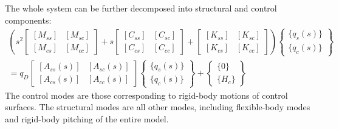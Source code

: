 The whole system can be further decomposed into structural and control components:
\begin{multline}
    \left( s^2 \begin{bmatrix}
        [M_{ss}] & [M_{sc}] \\
        [M_{cs}] & [M_{cc}]
    \end{bmatrix} + s \begin{bmatrix}
        [C_{ss}] & [C_{sc}] \\
        [C_{cs}] & [C_{cc}]
    \end{bmatrix} + \begin{bmatrix}
        [K_{ss}] & [K_{sc}] \\
        [K_{cs}] & [K_{cc}]
    \end{bmatrix} \right) \begin{Bmatrix}
        \{q_s(s)\} \\
        \{q_c(s)\}
    \end{Bmatrix} \\ = q_D \begin{bmatrix}
        [A_{ss}(s)] & [A_{sc}(s)] \\
        [A_{cs}(s)] & [A_{cc}(s)]
    \end{bmatrix} \begin{Bmatrix}
        \{q_s(s)\} \\
        \{q_c(s)\}
    \end{Bmatrix}
    + \begin{Bmatrix}
        \{0\} \\
        \{H_c\}
    \end{Bmatrix}
\end{multline}
The control modes are those corresponding to rigid-body motions of control surfaces. The structural modes are all other modes, including flexible-body modes and rigid-body pitching of the entire model.


